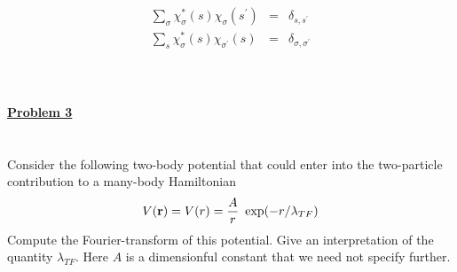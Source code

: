 \documentclass{article}
\begin{document}
\begin{eqnarray}
\sum_{\sigma} \chi^*_\sigma(s)  \chi_\sigma(s^{\prime}) & = & \delta_{s,s^{\prime}} \nonumber \\
\sum_{s} \chi^*_\sigma(s)  \chi_{\sigma^{\prime}}(s) & = & \delta_{\sigma,\sigma^{\prime}} \nonumber
\end{eqnarray}
\ \\
\ \\
\ \\
\underline{\large\bf Problem 3 }\\
\ \\
\ \\
Consider the following two-body potential that could enter into the two-particle contribution to a many-body Hamiltonian
\begin{eqnarray}
V({\bf r}) = V(r) = \frac{A}{r} ~ \exp(-r/\lambda_{TF}) \nonumber 
\end{eqnarray} 
Compute the Fourier-transform of this potential. Give an interpretation of the quantity $\lambda_{TF}$. Here $A$ is a dimensionful constant that we need not specify further. 

\ \\
\ \\
\end{document}
